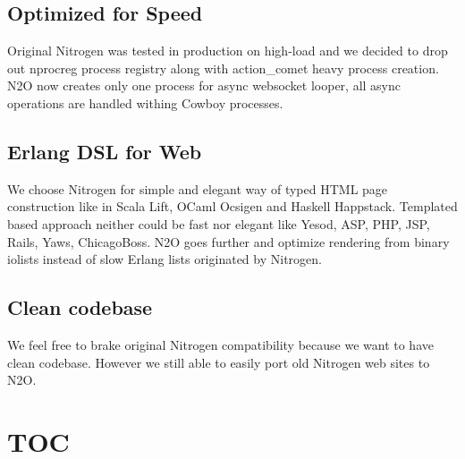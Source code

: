 \documentclass[11pt]{article}
\begin{document}
\subsection*{Optimized for Speed}
Original Nitrogen was tested in production on high-load and we decided to drop out
nprocreg process registry along with action_comet heavy process creation. N2O now creates
only one process for async websocket looper, all async operations are handled withing
Cowboy processes.

\subsection*{Erlang DSL for Web}
We choose Nitrogen for simple and elegant way of typed HTML page construction like 
in Scala Lift, OCaml Ocsigen and Haskell Happstack.
Templated based approach neither could be fast nor elegant like 
Yesod, ASP, PHP, JSP, Rails, Yaws, ChicagoBoss.
N2O goes further and optimize rendering from binary iolists instead of slow Erlang
lists originated by Nitrogen.

\subsection*{Clean codebase}
We feel free to brake original Nitrogen compatibility because we want to have clean codebase.
However we still able to easily port old Nitrogen web sites to N2O.

\section*{TOC}
\paragraph{}
 \@br
{} \@br
{} \@br
{} \@br
{} \@br

\end{document}
